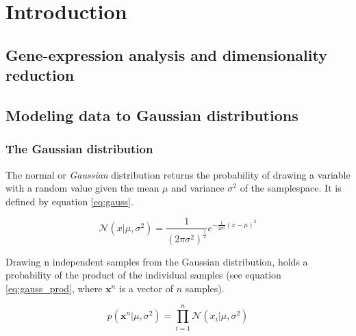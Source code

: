 \section{Introduction}

\subsection{Gene-expression analysis and dimensionality reduction}

\subsection{Modeling data to Gaussian distributions}
\subsubsection{The Gaussian distribution}


The normal or \textit{Gaussian} distribution returns the probability of drawing a variable with a random value given the mean $\mu$ and variance $\sigma^2$ of the samplespace. It is defined by equation \ref{eq:gauss}.

\begin{equation}\label{eq:gauss}
    \mathcal{N}(x|\mu, \sigma^2)=\frac{1}{(2 \pi \sigma ^2)^{\frac{1}{2}}} e^{- \frac{1}{2\sigma ^2}(x - \mu)^2}
\end{equation}

Drawing \gls{n} independent samples from the Gaussian distribution, holds a probability of the product of the individual samples (see equation \ref{eq:gauss_prod}, where $\textbf{x}^n$ is a vector of $n$ samples).


\begin{equation}\label{eq:gauss_prod}
    p(\textbf{x}^n | \mu, \sigma^2) = \prod_{i=1}^{n}{\mathcal{N}(x_i|\mu, \sigma^2)}
\end{equation}

